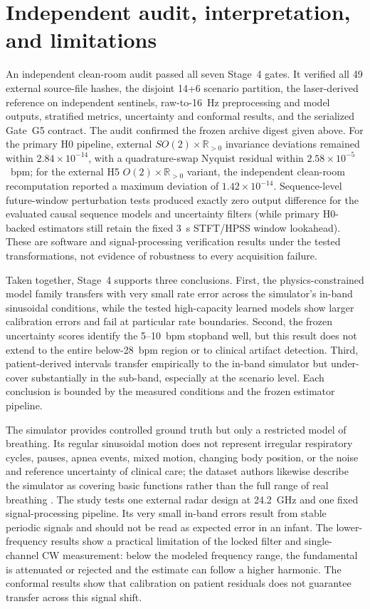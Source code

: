 \section{Independent audit, interpretation, and limitations}

An independent clean-room audit passed all seven Stage~4 gates. It verified all 49 external source-file hashes, the disjoint 14+6 scenario partition, the laser-derived reference on independent sentinels, raw-to-16~Hz preprocessing and model outputs, stratified metrics, uncertainty and conformal results, and the serialized Gate~G5 contract. The audit confirmed the frozen archive digest given above. For the primary H0 pipeline, external $SO(2)\times\mathbb{R}_{>0}$ invariance deviations remained within $2.84\times10^{-14}$, with a quadrature-swap Nyquist residual within $2.58\times10^{-5}$~bpm; for the external H5 $O(2)\times\mathbb{R}_{>0}$ variant, the independent clean-room recomputation reported a maximum deviation of $1.42\times10^{-14}$. Sequence-level future-window perturbation tests produced exactly zero output difference for the evaluated causal sequence models and uncertainty filters (while primary H0-backed estimators still retain the fixed 3~s STFT/HPSS window lookahead). These are software and signal-processing verification results under the tested transformations, not evidence of robustness to every acquisition failure.

Taken together, Stage~4 supports three conclusions. First, the physics-constrained model family transfers with very small rate error across the simulator's in-band sinusoidal conditions, while the tested high-capacity learned models show larger calibration errors and fail at particular rate boundaries. Second, the frozen uncertainty scores identify the 5--10~bpm stopband well, but this result does not extend to the entire below-28~bpm region or to clinical artifact detection. Third, patient-derived intervals transfer empirically to the in-band simulator but under-cover substantially in the sub-band, especially at the scenario level. Each conclusion is bounded by the measured conditions and the frozen estimator pipeline.

The simulator provides controlled ground truth but only a restricted model of breathing. Its regular sinusoidal motion does not represent irregular respiratory cycles, pauses, apnea events, mixed motion, changing body position, or the noise and reference uncertainty of clinical care; the dataset authors likewise describe the simulator as covering basic functions rather than the full range of real breathing \citep{gleichauf2024time}. The study tests one external radar design at 24.2~GHz and one fixed signal-processing pipeline. Its very small in-band errors result from stable periodic signals and should not be read as expected error in an infant. The lower-frequency results show a practical limitation of the locked filter and single-channel CW measurement: below the modeled frequency range, the fundamental is attenuated or rejected and the estimate can follow a higher harmonic. The conformal results show that calibration on patient residuals does not guarantee transfer across this signal shift.

